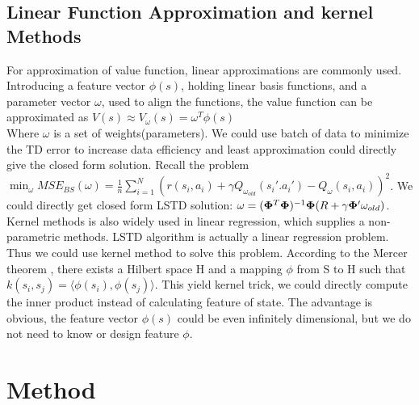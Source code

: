 \subsection{Linear Function Approximation and kernel Methods } %
For approximation of value function, linear approximations are commonly used. Introducing a feature vector $\phi(s)$, holding linear basis functions, and a parameter vector $\omega$,
used to align the functions, the value function can be approximated as  $V(s) \approx V_\omega (s) = \omega^T \phi (s)$\\
 Where $\omega$ is a set of weights(parameters). We could use batch of data to minimize the TD error to increase data efficiency and least approximation could directly give the closed form solution. Recall the problem
$\min_\omega MSE_{BS}(\omega) = \frac{1}{n} \sum_{i=1}^{N}(r(s_i, a_i) + \gamma Q_{\omega_{old}} (s_i'. a_i') - Q_\omega (s_i, a_i) )^2$. We could directly get closed form LSTD solution: $\omega = (\vec{\Phi}^T \vec\Phi)^{-1}\vecPhi(R+\gamma\vecPhi' \omega_{old})$. 
\\
Kernel methods is also widely used in linear regression, which supplies a non-parametric methods.  LSTD algorithm is actually a linear regression problem. Thus we could use kernel method to solve this problem. According to the Mercer theorem \cite{vapnik1999overview}, there exists a Hilbert space H and a mapping $\phi$ from S to H such that $k(s_i, s_j) = \langle \phi(s_i), \phi(s_j) \rangle$. This yield kernel trick, we could directly compute the inner product instead of calculating feature of state. The advantage is obvious, the feature vector $\phi(s)$ could be even infinitely dimensional, but we do not need to know or design feature $\phi$. 



\section{Method}
